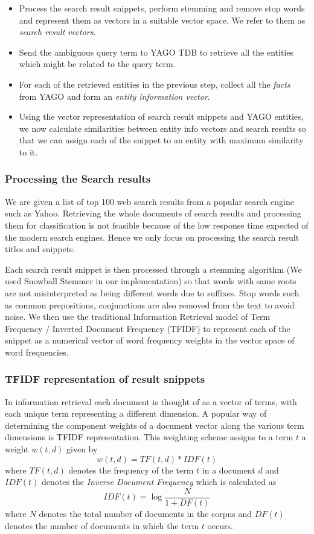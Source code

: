 \documentclass[a4paper,12pt]{report}
\begin{document}
\begin{itemize}
  \item Process the search result snippets, perform stemming and
    remove stop words and represent them as vectors in a suitable
    vector space. We refer to them as {\it search result vectors}.
  \item Send the ambiguous query term to YAGO TDB to retrieve all the
    entities which might be related to the query term.
  \item For each of the retrieved entities in the previous step,
    collect all the {\it facts} from YAGO and form an {\it entity
      information vector}.
  \item Using the vector representation of search result snippets and
    YAGO entities, we now calculate similarities between entity info
    vectors and search results so that we can assign each of the
    snippet to an entity with maximum similarity to it.

\end{itemize}

\subsubsection{Processing the Search results}

We are given a list of top 100 web search results from a popular
search engine such as Yahoo. Retrieving the whole documents of search
results and processing them for classification is not feasible because
of the low response time expected of the modern search engines. Hence
we only focus on processing the search result titles and snippets. 

Each search result snippet is then processed through a stemming
algorithm (We used Snowball Stemmer in our implementation) so that
words with same roots are not misinterpreted as being different words
due to suffixes. Stop words such as common prepositions, conjunctions
are also removed from the text to avoid noise. We then use the
traditional Information Retrieval model of Term Frequency / Inverted
Document Frequency (TFIDF) to represent each of the snippet as a
numerical vector of word frequency weights in the vector space of
word frequencies.

\subsubsection{TFIDF representation of result snippets}
In information retrieval each document is thought of as a vector of
terms, with each unique term representing a different dimension. A
popular way of determining the component weights of a document vector
along the various term dimensions is TFIDF representation. This
weighting scheme assigns to a term $t$ a weight $w(t,d)$ given by 
$$ w(t,d) = TF(t,d) * IDF(t) $$
where $TF(t,d)$ denotes the frequency of the term $t$ in a document
$d$ and $IDF(t)$ denotes the {\it Inverse Document Frequency} which is
calculated as 
$$ IDF(t) = \log \frac{N}{1 + DF(t)} $$
where $N$ denotes the total number of documents in the corpus and
$DF(t)$ denotes the number of documents in which the term $t$ occurs. 
\end{document}
